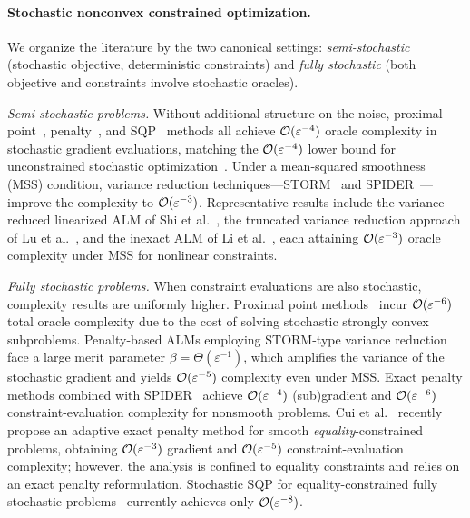 \documentclass[10pt]{article}
\begin{document}
\paragraph{Stochastic nonconvex constrained optimization.}
We organize the literature by the two canonical settings:
\emph{semi-stochastic} (stochastic objective, deterministic constraints) and
\emph{fully stochastic} (both objective and constraints involve stochastic
oracles).

\emph{Semi-stochastic problems.}
Without additional structure on the noise, proximal point~\cite{boob2023stochastic,ma2022quadratically},
penalty~\cite{jin2022nested}, and SQP~\cite{curtis2021sqp} methods all achieve
$\mathcal{O}(\varepsilon^{-4})$ oracle complexity in stochastic gradient evaluations,
matching the $\mathcal{O}(\varepsilon^{-4})$ lower bound for unconstrained stochastic
optimization~\cite{arjevani2023lower}.
Under a mean-squared smoothness (MSS) condition,
variance reduction techniques---STORM~\cite{cutkosky2019storm} and
SPIDER~\cite{fang2018spider}---improve the complexity to $\mathcal{O}(\varepsilon^{-3})$.
Representative results include the variance-reduced linearized ALM of
Shi et al.~\cite{shi2022linearized}, the truncated variance reduction approach
of Lu et al.~\cite{lu2022single}, and the inexact ALM of
Li et al.~\cite{li2021rate}, each attaining $\mathcal{O}(\varepsilon^{-3})$ oracle
complexity under MSS for nonlinear constraints.

\emph{Fully stochastic problems.}
When constraint evaluations are also stochastic, complexity results are
uniformly higher.
Proximal point methods~\cite{boob2023stochastic,ma2022quadratically} incur
$\mathcal{O}(\varepsilon^{-6})$ total oracle complexity due to the cost of solving
stochastic strongly convex subproblems.
Penalty-based ALMs employing STORM-type variance
reduction~\cite{alacaoglu2023augmented,cui2022complexity} face a large merit
parameter $\beta = \Theta(\varepsilon^{-1})$, which amplifies the variance of
the stochastic gradient and yields $\mathcal{O}(\varepsilon^{-5})$ complexity even
under MSS.
Exact penalty methods combined with SPIDER~\cite{liu2022exact} achieve
$\mathcal{O}(\varepsilon^{-4})$ (sub)gradient and $\mathcal{O}(\varepsilon^{-6})$
constraint-evaluation complexity for nonsmooth problems.
Cui et al.~\cite{cui2024adaptive} recently propose an adaptive exact penalty
method for smooth \emph{equality}-constrained problems, obtaining
$\mathcal{O}(\varepsilon^{-3})$ gradient and $\mathcal{O}(\varepsilon^{-5})$
constraint-evaluation complexity; however, the analysis is confined to equality
constraints and relies on an exact penalty reformulation.
Stochastic SQP for equality-constrained fully stochastic problems~\cite{na2022sqp}
currently achieves only $\mathcal{O}(\varepsilon^{-8})$.
\end{document}
